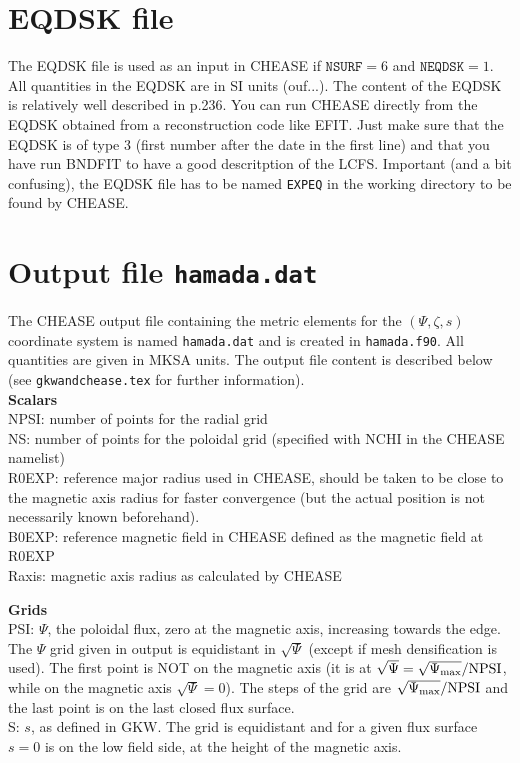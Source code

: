 \documentclass[a4paper,12pt]{article}
\newcommand{\ind}[1]{\ensuremath{_{\rm{#1}}}}
\begin{document}
\section{EQDSK file}
The EQDSK file is used as an input in CHEASE if $\texttt{NSURF}=6$ and $\texttt{NEQDSK}=1$. All quantities in the EQDSK are in SI units (ouf...). The content of the EQDSK is relatively well described
in \cite{Lutjens:Comput1996} p.236. You can run CHEASE directly from the EQDSK obtained from a reconstruction code like EFIT. Just make sure that the EQDSK is of type 3 (first number after the date
in the first line) and that you have run BNDFIT to have a good descritption of the LCFS. Important (and a bit confusing), the EQDSK file has to be named \texttt{EXPEQ} in the working directory to be
found by CHEASE.

\section{Output file \texttt{hamada.dat}}
The CHEASE output file containing the metric elements for the $(\Psi,\zeta,s)$ coordinate system is named \texttt{hamada.dat} and is created in \texttt{hamada.f90}. All quantities are
given in MKSA units. The output file content is described below (see \texttt{gkwandchease.tex} for further information).\\

\textbf{Scalars}\\
NPSI: number of points for the radial grid\\
NS: number of points for the poloidal grid (specified with NCHI in the CHEASE namelist)\\
R0EXP: reference major radius used in CHEASE, should be taken to be close to the magnetic axis radius for faster convergence (but the actual position is not necessarily known beforehand).\\
B0EXP: reference magnetic field in CHEASE defined as the magnetic field at R0EXP\\
Raxis: magnetic axis radius as calculated by CHEASE
\vspace{0.5cm}

\textbf{Grids}\\
PSI: $\Psi$, the poloidal flux, zero at the magnetic axis, increasing towards the edge. The $\Psi$ grid given in output is equidistant in $\sqrt{\Psi}$ (except if mesh densification is used). The
first point is NOT on the magnetic axis (it is at $\sqrt{\Psi}=\sqrt{\Psi\ind{\max}}/\mathrm{NPSI}$, while on the magnetic axis $\sqrt{\Psi}=0$). The steps of the grid are $\sqrt{\Psi\ind{\max}}/\mathrm{NPSI}$ and the last point is on the last closed flux surface.\\
S: $s$, as defined in GKW. The grid is equidistant and for a given flux surface $s=0$ is on the low field side, at the height of the magnetic axis. 
\vspace{0.5cm}
\end{document}
